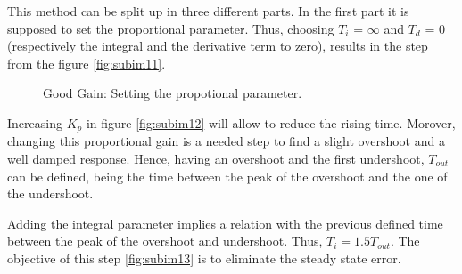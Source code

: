 This method can be split up in three different parts. In the first part it is supposed to set the proportional parameter. Thus, choosing $T_i$ = $\infty$ and $T_d$ = 0 (respectively the integral and the derivative term to zero), results in the step from the figure \ref{fig:subim11}.
\begin{figure}[H]
\hfill
{}
\hfill
{}

\caption{Good Gain: Setting the propotional parameter.}
\end{figure}


Increasing $K_p$ in figure \ref{fig:subim12} will allow to reduce the rising time. Morover, changing this proportional gain is a needed step to find a slight overshoot and a well damped response. Hence, having an overshoot and the first undershoot, $T_{out}$ can be defined, being the time between the peak of the overshoot and the one of the undershoot.\par
\vspace{5mm}
Adding the integral parameter implies a relation with the previous defined time between the peak of the overshoot and undershoot. Thus, $T_i = 1.5T_{out}$. The objective of this step \ref{fig:subim13} is to eliminate the steady state error.



